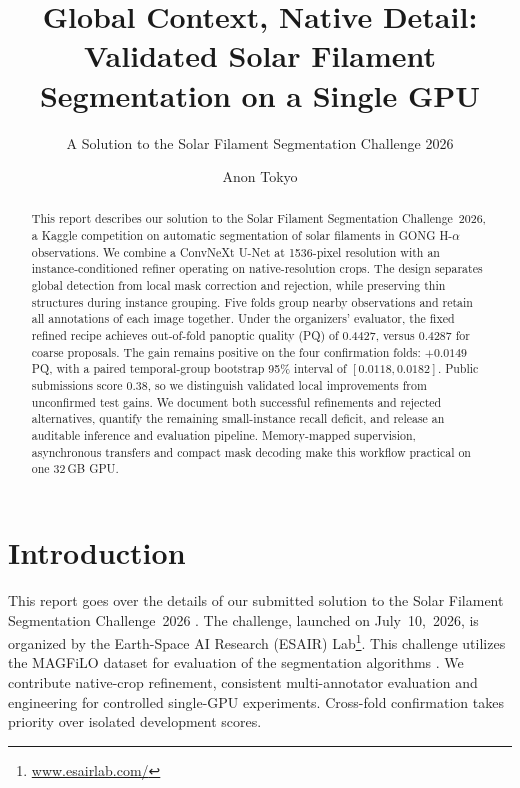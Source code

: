 \documentclass[sigconf]{acmart}
\begin{document}
\title[Global Context, Native Detail]{Global Context, Native Detail: Validated Solar Filament Segmentation on a Single GPU}
\subtitle{A Solution to the Solar Filament Segmentation Challenge 2026}
\author{Anon Tokyo}
\renewcommand{\shortauthors}{Anon Tokyo}

\begin{abstract}
This report describes our solution to the Solar Filament Segmentation Challenge~2026, a Kaggle competition on automatic segmentation of solar filaments in GONG H-$\alpha$ observations.
We combine a ConvNeXt U-Net at 1536-pixel resolution with an instance-conditioned refiner operating on native-resolution crops. The design separates global detection from local mask correction and rejection, while preserving thin structures during instance grouping. Five folds group nearby observations and retain all annotations of each image together. Under the organizers' evaluator, the fixed refined recipe achieves out-of-fold panoptic quality (PQ) of 0.4427, versus 0.4287 for coarse proposals. The gain remains positive on the four confirmation folds: $+0.0149$ PQ, with a paired temporal-group bootstrap 95\% interval of $[0.0118,0.0182]$. Public submissions score 0.38, so we distinguish validated local improvements from unconfirmed test gains. We document both successful refinements and rejected alternatives, quantify the remaining small-instance recall deficit, and release an auditable inference and evaluation pipeline. Memory-mapped supervision, asynchronous transfers and compact mask decoding make this workflow practical on one 32\,GB GPU.
\end{abstract}
\maketitle

\section{Introduction}
This report goes over the details of our submitted solution to the Solar Filament Segmentation Challenge~2026 \cite{filament-segmentation-2026}. The challenge, launched on July~10,~2026, is organized by the Earth-Space AI Research (ESAIR) Lab\footnote{\href{https://www.esairlab.com/home}{www.esairlab.com/}}. This challenge utilizes the MAGFiLO dataset for evaluation of the segmentation algorithms \cite{ahmadzadeh2024dataset}.
We contribute native-crop refinement, consistent multi-annotator evaluation and engineering for controlled single-GPU experiments. Cross-fold confirmation takes priority over isolated development scores.
\end{document}
